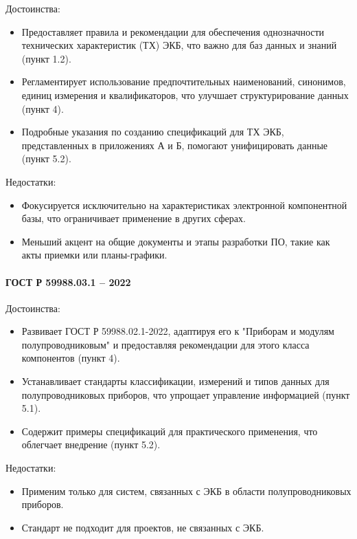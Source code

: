 Достоинства:

\begin{itemize}
	\item Предоставляет правила
		и рекомендации для обеспечения однозначности
		технических характеристик (ТХ) ЭКБ,
		что важно для баз данных и знаний (пункт 1.2).
	\item Регламентирует использование предпочтительных наименований,
		синонимов, единиц измерения и квалификаторов,
		что улучшает структурирование данных (пункт 4).
	\item Подробные указания по созданию спецификаций для ТХ ЭКБ,
		представленных в приложениях А и Б,
		помогают унифицировать данные (пункт 5.2).
\end{itemize}

Недостатки:

\begin{itemize}
	\item Фокусируется исключительно на характеристиках
		электронной компонентной базы,
		что ограничивает применение в других сферах.
	\item Меньший акцент на общие документы и этапы разработки ПО,
		такие как акты приемки или планы-графики.
\end{itemize}

\paragraph{ГОСТ Р 59988.03.1 -- 2022}

Достоинства:

\begin{itemize}
	\item Развивает ГОСТ Р 59988.02.1-2022,
		адаптируя его к "Приборам и модулям полупроводниковым"
		и предоставляя рекомендации для этого класса компонентов (пункт 4).
	\item Устанавливает стандарты классификации,
		измерений и типов данных для полупроводниковых приборов,
		что упрощает управление информацией (пункт 5.1).
	\item Содержит примеры спецификаций для практического применения,
		что облегчает внедрение (пункт 5.2).
\end{itemize}

Недостатки:

\begin{itemize}
	\item Применим только для систем,
		связанных с ЭКБ в области полупроводниковых приборов.
	\item Стандарт не подходит для проектов, не связанных с ЭКБ.
\end{itemize}

